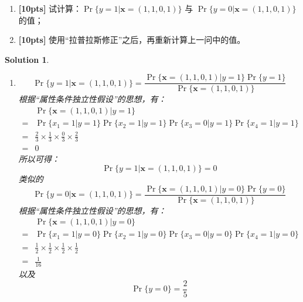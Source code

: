\documentclass[a4paper,UTF8]{article}
\numberwithin{equation}{section}
\newtheorem*{mySol}{Solution}
\begin{document}
	\begin{enumerate}[ {(}1{)}]
		\item \textbf{[10pts]} 试计算：$\Pr\{ y=1 | \mathbf{x}=(1,1,0,1) \}$ 与 $\Pr\{ y=0 | \mathbf{x}=(1,1,0,1) \}$ 的值；
		\item \textbf{[10pts]} 使用“拉普拉斯修正”之后，再重新计算上一问中的值。
	\end{enumerate}
	
\begin{mySol}
	~\\
\begin{enumerate}[ {(}1{)}]
\item 
\begin{equation}
\Pr\{ y=1 | \mathbf{x}=(1,1,0,1) \} = \frac{\Pr\{\mathbf{x}=(1,1,0,1) | y=1  \} \Pr\{y=1\}}{\Pr\{\mathbf{x}=(1,1,0,1) \}}
\end{equation}
根据“属性条件独立性假设”的思想，有：
\begin{equation}
\begin{aligned}
&\Pr\{\mathbf{x}=(1,1,0,1) | y=1  \}\\ 
=& \Pr\{x_1 = 1 | y = 1\}\Pr\{x_2 = 1 | y = 1\}\Pr\{x_3 = 0 | y = 1\}\Pr\{x_4 = 1 | y = 1\}\\
=& \frac{2}{3}\times\frac{1}{3}\times\frac{0}{3}\times\frac{2}{3}\\
=& 0
\end{aligned}
\end{equation}
所以可得：
\begin{equation}
\Pr\{ y=1 | \mathbf{x}=(1,1,0,1) \} = 0
\end{equation}
类似的
\begin{equation}
\Pr\{ y=0 | \mathbf{x}=(1,1,0,1) \} = \frac{\Pr\{\mathbf{x}=(1,1,0,1) | y=0  \} \Pr\{y=0\}}{\Pr\{\mathbf{x}=(1,1,0,1) \}}
\end{equation}
根据“属性条件独立性假设”的思想，有：
\begin{equation}
\begin{aligned}
&\Pr\{\mathbf{x}=(1,1,0,1) | y=0  \}\\ 
=& \Pr\{x_1 = 1 | y = 0\}\Pr\{x_2 = 1 | y = 0\}\Pr\{x_3 = 0 | y = 0\}\Pr\{x_4 = 1 | y = 0\}\\
=& \frac{1}{2}\times\frac{1}{2}\times\frac{1}{2}\times\frac{1}{2}\\
=& \frac{1}{16}
\end{aligned}
\end{equation}
以及
\begin{equation}
\Pr\{y=0\} = \frac{2}{5}
\end{equation}

\end{enumerate}
\end{mySol}
\end{document}
